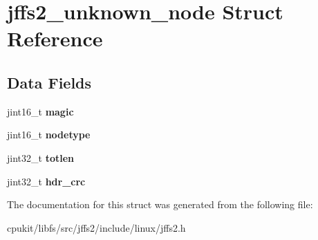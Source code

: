 \hypertarget{structjffs2__unknown__node}{}\section{jffs2\+\_\+unknown\+\_\+node Struct Reference}
\label{structjffs2__unknown__node}
\subsection*{Data Fields}
\begin{DoxyCompactItemize}
\item 
\mbox{\label{structjffs2__unknown__node_ae119b7e30568c2c82bdb839dbe9a3687}} 
jint16\+\_\+t {\bfseries magic}
\item 
\mbox{\label{structjffs2__unknown__node_af81619d7f0221e767ad8d0333969a61a}} 
jint16\+\_\+t {\bfseries nodetype}
\item 
\mbox{\label{structjffs2__unknown__node_a78923cae4ebc1b8311944bca61f1f302}} 
jint32\+\_\+t {\bfseries totlen}
\item 
\mbox{\label{structjffs2__unknown__node_a60e5d35efb07f1c047c4312116af36a4}} 
jint32\+\_\+t {\bfseries hdr\+\_\+crc}
\end{DoxyCompactItemize}


The documentation for this struct was generated from the following file\+:\begin{DoxyCompactItemize}
\item 
cpukit/libfs/src/jffs2/include/linux/jffs2.\+h\end{DoxyCompactItemize}
